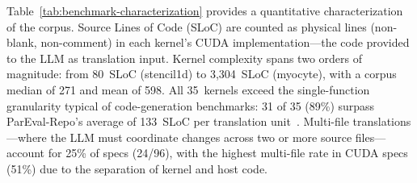 \documentclass{article}
\begin{document}

Table~\ref{tab:benchmark-characterization} provides a quantitative characterization of the corpus. Source Lines of Code (SLoC) are counted as physical lines (non-blank, non-comment) in each kernel's CUDA implementation---the code provided to the LLM as translation input. Kernel complexity spans two orders of magnitude: from 80~SLoC (stencil1d) to 3{,}304~SLoC (myocyte), with a corpus median of 271 and mean of 598. All 35~kernels exceed the single-function granularity typical of code-generation benchmarks: 31 of 35 (89\%) surpass ParEval-Repo's average of 133~SLoC per translation unit~\cite{ParEvalRepo2025}. Multi-file translations---where the LLM must coordinate changes across two or more source files---account for 25\% of specs (24/96), with the highest multi-file rate in CUDA specs (51\%) due to the separation of kernel and host code.


\end{document}
